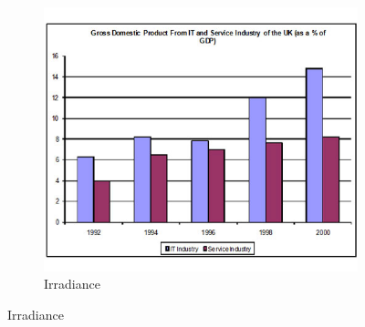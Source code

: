 \documentclass[18pt]{article}
\begin{document}
\begin{figure}
\begin{subfigure}[b]{0.3\textwidth}
\end{subfigure}
\hfill
	\begin{subfigure}[b]{0.3\textwidth}
	\centering
	\includegraphics[width=\textwidth]{figures/sample1.jpeg}
	\caption{Irradiance}
	\label{fig:y equals x}
\end{subfigure}



\end{figure}
\end{document}
